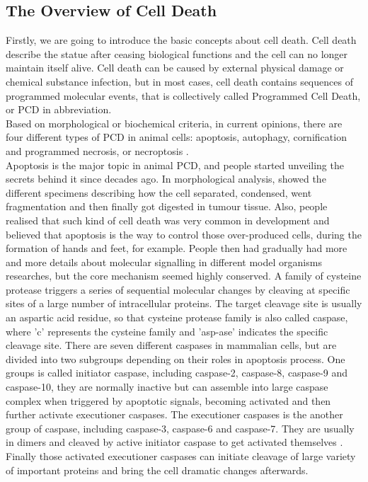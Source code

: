 \subsection{The Overview of Cell Death}
Firstly, we are going to introduce the basic concepts about cell death. Cell death describe the statue after ceasing biological functions and the cell can no longer maintain itself alive. Cell death can be caused by external physical damage or chemical substance infection, but in most cases, cell death contains sequences of programmed molecular events, that is collectively called Programmed Cell Death, or PCD in abbreviation. \\
Based on morphological or biochemical criteria, in current opinions, there are four different types of PCD in animal cells: apoptosis, autophagy, cornification and programmed necrosis, or necroptosis \citep{kroemer2009classification}.\\
Apoptosis is the major topic in animal PCD, and people started unveiling the secrets behind it since decades ago. In morphological analysis, \citet{kerr1972apoptosis} showed the different specimens describing how the cell separated, condensed, went fragmentation and then finally got digested in tumour tissue. Also, people realised that such kind of cell death was very common in development and believed that apoptosis is the way to control those over-produced cells, during the formation of hands and feet, for example. People then had gradually had more and more details about molecular signalling in different model organisms researches, but the core mechanism seemed highly conserved. A family of cysteine protease triggers a series of sequential molecular changes by cleaving at specific sites of a large number of intracellular proteins. The target cleavage site is usually an aspartic acid residue, so that cysteine protease family is also called caspase, where 'c' represents the cysteine family and 'asp-ase' indicates the specific cleavage site. There are seven different caspases in mammalian cells, but are divided into two subgroups depending on their roles in apoptosis process. One groups is called initiator caspase, including caspase-2, caspase-8, caspase-9 and caspase-10, they are normally inactive but can assemble into large caspase complex when triggered by apoptotic signals, becoming activated and then further activate executioner caspases. The executioner caspases is the another group of caspase, including caspase-3, caspase-6 and caspase-7. They are usually in dimers and cleaved by active initiator caspase to get activated themselves \citep{bao2007apoptosome}. Finally those activated executioner caspases can initiate cleavage of large variety of important proteins and bring the cell dramatic changes afterwards. \\

